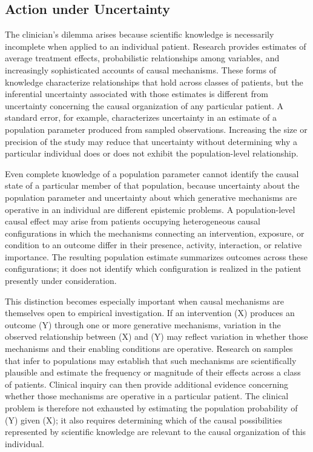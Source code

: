 \documentclass[11pt]{article}
\begin{document}
\subsection{Action under Uncertainty}

The clinician’s dilemma arises because scientific knowledge is necessarily incomplete when applied to an individual patient. Research provides estimates of average treatment effects, probabilistic relationships among variables, and increasingly sophisticated accounts of causal mechanisms. These forms of knowledge characterize relationships that hold across classes of patients, but the inferential uncertainty associated with those estimates is different from uncertainty concerning the causal organization of any particular patient. A standard error, for example, characterizes uncertainty in an estimate of a population parameter produced from sampled observations. Increasing the size or precision of the study may reduce that uncertainty without determining why a particular individual does or does not exhibit the population-level relationship.

Even complete knowledge of a population parameter cannot identify the causal state of a particular member of that population, because uncertainty about the population parameter and uncertainty about which generative mechanisms are operative in an individual are different epistemic problems. A population-level causal effect may arise from patients occupying heterogeneous causal configurations in which the mechanisms connecting an intervention, exposure, or condition to an outcome differ in their presence, activity, interaction, or relative importance. The resulting population estimate summarizes outcomes across these configurations; it does not identify which configuration is realized in the patient presently under consideration.

This distinction becomes especially important when causal mechanisms are themselves open to empirical investigation. If an intervention (X) produces an outcome (Y) through one or more generative mechanisms, variation in the observed relationship between (X) and (Y) may reflect variation in whether those mechanisms and their enabling conditions are operative. Research on samples that infer to populations may establish that such mechanisms are scientifically plausible and estimate the frequency or magnitude of their effects across a class of patients. Clinical inquiry can then provide additional evidence concerning whether those mechanisms are operative in a particular patient. The clinical problem is therefore not exhausted by estimating the population probability of (Y) given (X); it also requires determining which of the causal possibilities represented by scientific knowledge are relevant to the causal organization of this individual.
\end{document}
